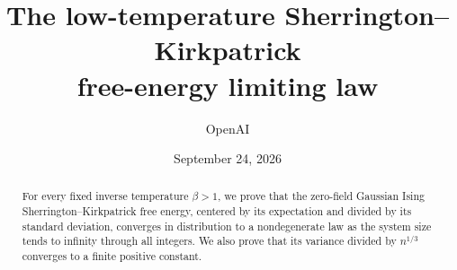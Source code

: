 \documentclass[11pt]{article}
\title{The low-temperature Sherrington--Kirkpatrick\\free-energy limiting law}
\author{OpenAI}
\date{September 24, 2026}
\numberwithin{equation}{section}
\theoremstyle{definition}
\theoremstyle{remark}
\begin{document}
\maketitle
\begin{abstract}
For every fixed inverse temperature $\beta>1$, we prove that the zero-field Gaussian Ising Sherrington--Kirkpatrick free energy, centered by its expectation and divided by its standard deviation, converges in distribution to a nondegenerate law as the system size tends to infinity through all integers. We also prove that its variance divided by $n^{1/3}$ converges to a finite positive constant.
\end{abstract}
\setcounter{tocdepth}{1}
\tableofcontents
\clearpage











\appendix


\begingroup
\raggedright


\endgroup
\end{document}
